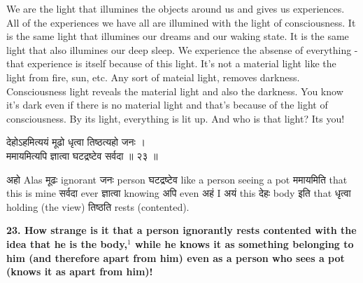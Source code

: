 \documentclass{article}
\begin{document}
\begin{oframed}

    We are the light that illumines the objects around us and gives us
    experiences. All of the experiences we have all are illumined with the
    light of consciousness. It is the same light that illumines our dreams and
    our waking state. It is the same light that also illumines our deep sleep.
    We experience the absense of everything - that experience is itself because
    of this light. It's not a material light like the light from fire, sun,
    etc. Any sort of mateial light, removes darkness. Consciousness light
    reveals the material light and also the darkness. You know it's dark even
    if there is no material light and that's because of the light of
    consciousness. By its light, everything is lit up. And who is that light?
    Its you!

\end{oframed}


\begin{large}
\begin{center}
    \begin{hindi}

    देहोऽहमित्ययं मूढो धृत्वा तिष्ठत्यहो जनः ।\\
    ममायमित्यपि ज्ञात्वा घटद्रष्टेव सर्वदा ॥ २३ ॥

    \end{hindi}
\end{center}
\end{large}

\texthindi{अहो}
Alas
\texthindi{मूढः}
ignorant
\texthindi{जनः}
person
\texthindi{घटद्रष्टेव}
like a person seeing a pot
\texthindi{ममायमिति}
that this is mine
\texthindi{सर्वदा}
ever
\texthindi{ज्ञात्वा}
knowing
\texthindi{अपि}
even
\texthindi{अहं}
I
\texthindi{अयं}
this
\texthindi{देहः}
body
\texthindi{इति}
that
\texthindi{धृत्वा}
holding (the view)
\texthindi{तिष्ठति}
rests (contented).

\bigskip

\textbf{23. How strange is it that a person ignorantly rests contented with the
idea that he is the body,$^1$ while he knows it as something belonging to him
(and therefore apart from him) even as a person who sees a pot (knows it as
apart from him)!  }
\end{document}
